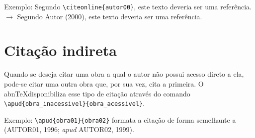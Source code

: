     Exemplo: Segundo \verb+\citeonline{autor00}+, este texto deveria ser uma referência. $\to$ Segundo Autor (2000), este texto deveria ser uma referência.
	
	\section{Citação indireta}
	Quando se deseja citar uma obra a qual o autor não possui acesso direto a ela, pode-se citar uma outra obra que, por sua vez, cita a primeira. O abn\TeX disponibiliza esse tipo de citação através do comando \verb+\apud{obra_inacessivel}{obra_acessivel}+.
	
	Exemplo: \verb+\apud{obra01}{obra02}+ formata a citação de forma semelhante a (AUTOR01, 1996; \textit{apud} AUTOR02, 1999).